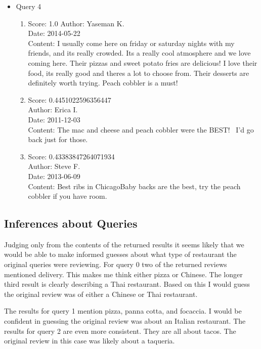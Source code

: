 \documentclass[paper=a4, fontsize=11pt]{jhwhw} %
\begin{document}
\begin{itemize}
\begin{enumerate}
        \end{enumerate}
    \item Query 4
        \begin{enumerate}
            \item Score: 1.0
                Author: Yaseman K.\\
                Date: 2014-05-22\\
                Content: I usually come here on friday or saturday nights with my friends, and its really crowded. Its a really cool atmosphere and we love coming here. Their pizzas and sweet potato fries are delicious! I love their food, its really good and theres a lot to choose from. Their desserts are definitely worth trying. Peach cobbler is a must!
            \item Score: 0.4451022596356447 \\
                Author: Erica I.\\
                Date: 2011-12-03\\
                Content: The mac and cheese and peach cobbler were the BEST!  I'd go back just for those.
            \item Score: 0.43383847264071934\\
                Author: Steve F.\\
                Date: 2013-06-09\\
                Content: Best ribs in ChicagoBaby backs are the best, try the peach cobbler if you have room.
        \end{enumerate}
\end{itemize}

\subsection{Inferences about Queries}
Judging only from the contents of the returned results it seems likely that we would be able to make informed guesses about what type of restaurant the original queries were reviewing. For query 0 two of the returned reviews mentioned delivery. This makes me think either pizza or Chinese. The longer third result is clearly describing a Thai restaurant. Based on this I would guess the original review was of either a Chinese or Thai restaurant. 

The results for query 1 mention pizza, panna cotta, and focaccia. I would be confident in guessing the original review was about an Italian restaurant. The results for query 2 are even more consistent. They are all about tacos. The original review in this case was likely about a taqueria.
\end{document}
